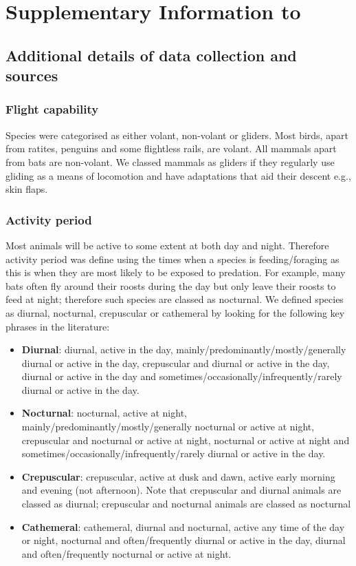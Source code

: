 \chapter{Supplementary Information to }%
\label{chap:Appendix B}

\section{Additional details of data collection and sources}

\subsection{Flight capability}
Species were categorised as either volant, non-volant or gliders. Most birds, apart from ratites, penguins and some flightless rails, are volant.  All mammals apart from bats are non-volant. We classed mammals as gliders if they regularly use gliding as a means of locomotion and have adaptations that aid their descent e.g., skin flaps.



\subsection{Activity period}

Most animals will be active to some extent at both day and night. Therefore activity period was define using the times when a species is feeding/foraging as this is when they are most likely to be exposed to predation. For example, many bats often fly around their roosts during the day but only leave their roosts to feed at night; therefore such species are classed as nocturnal. We defined species as diurnal, nocturnal, crepuscular or cathemeral by looking for the following key phrases in the literature:

\begin{itemize}
  \item \textbf{Diurnal}: diurnal, active in the day, mainly/predominantly/mostly/generally diurnal or active in the day, crepuscular and diurnal or active in the day, diurnal or active in the day and sometimes/occasionally/infrequently/rarely diurnal or active in the day.
  \item \textbf{Nocturnal}: nocturnal, active at night, mainly/predominantly/mostly/generally nocturnal or active at night, crepuscular and nocturnal or active at night, nocturnal or active at night and sometimes/occasionally/infrequently/rarely diurnal or active in the day.
  \item \textbf{Crepuscular}: crepuscular, active at dusk and dawn, active early morning and evening (not afternoon). Note that crepuscular and diurnal animals are classed as diurnal; crepuscular and nocturnal animals are classed as nocturnal
  \item \textbf{Cathemeral}: cathemeral, diurnal and nocturnal, active any time of the day or night, nocturnal and often/frequently diurnal or active in the day, diurnal and often/frequently nocturnal or active at night.
\end{itemize}


